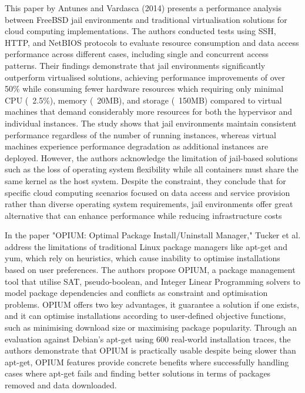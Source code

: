 \documentclass[journal,onecolumn]{IEEEtran}
\begin{document}
This paper by Antunes and Vardasca (2014)\cite{ANTUNES2014649} presents a performance analysis between FreeBSD jail environments and traditional virtualisation solutions for cloud computing implementations. The authors conducted tests using SSH, HTTP, and NetBIOS protocols to evaluate resource consumption and data access performance across different cases, including single and concurrent access patterns. Their findings demonstrate that jail environments significantly outperform virtualised solutions, achieving performance improvements of over 50\% while consuming fewer hardware resources which requiring only minimal CPU (~2.5\%), memory (~20MB), and storage (~150MB) compared to virtual machines that demand considerably more resources for both the hypervisor and individual instances. The study shows that jail environments maintain consistent performance regardless of the number of running instances, whereas virtual machines experience performance degradation as additional instances are deployed. However, the authors acknowledge the limitation of jail-based solutions such as the loss of operating system flexibility while all containers must share the same kernel as the host system. Despite the constraint, they conclude that for specific cloud computing scenarios focused on data access and service provision rather than diverse operating system requirements, jail environments offer great alternative that can enhance performance while reducing infrastructure costs

In the paper "OPIUM: Optimal Package Install/Uninstall Manager," Tucker et al.\cite{10.1109/ICSE.2007.59} address the limitations of traditional Linux package managers like apt-get and yum, which rely on heuristics, which cause inability to optimise installations based on user preferences. The authors propose OPIUM, a package management tool that utilise SAT, pseudo-boolean, and Integer Linear Programming solvers to model package dependencies and conflicts as constraint and optimisation problems. OPIUM offers two key advantages, it guarantee a solution if one exists, and it can optimise installations according to user-defined objective functions, such as minimising download size or maximising package popularity. Through an evaluation against Debian's apt-get using 600 real-world installation traces, the authors demonstrate that OPIUM is practically usable despite being slower than apt-get, OPIUM features provide concrete benefits where successfully handling cases where apt-get fails and finding better solutions in terms of packages removed and data downloaded.
\end{document}
